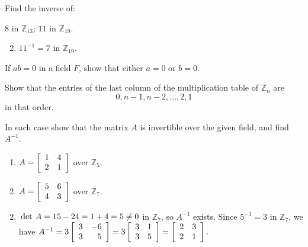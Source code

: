 \begin{multicols}{2}
\begin{ex}
Find the inverse of:

\begin{exenumerate}
\exitem $8$ in $\mathbb{Z}_{13}$;
\exitem $11$ in $\mathbb{Z}_{19}$.
\end{exenumerate}
\begin{sol}
\begin{enumerate}[label={\alph*.}]
\setcounter{enumi}{1}
\item  $11^{-1} = 7$ in $\mathbb{Z}_{19}$.

\end{enumerate}
\end{sol}
\end{ex}

\begin{ex}
If $ab = 0$ in a field $F$, show that either $a = 0$ or $b = 0$.
\end{ex}

\begin{ex}
Show that the entries of the last column of the multiplication table of $\mathbb{Z}_n$ are 
\begin{equation*}
0, n - 1, n - 2, \dots, 2, 1
\end{equation*}
 in that order.
\end{ex}

\begin{ex}
In each case show that the matrix $A$ is invertible over the given field, and find $A^{-1}$.

\begin{enumerate}[label={\alph*.}]
\item $A = \left[ \begin{array}{rr}
1 & 4 \\
2 & 1 
\end{array}\right]$ over $\mathbb{Z}_5$.

\item $A = \left[ \begin{array}{rr}
5 & 6 \\
4 & 3 
\end{array}\right]$ over $\mathbb{Z}_7$.

\end{enumerate}
\begin{sol}
\begin{enumerate}[label={\alph*.}]
\setcounter{enumi}{1}
\item  $\thinspace\operatorname{det\medspace} A = 15 - 24 = 1 + 4 = 5 \neq 0$ in $\mathbb{Z}_{7}$, so $A^{-1}$ exists. Since $5^{-1} = 3$ in $\mathbb{Z}_{7}$, we have
$A^{-1} = 3\left[ \begin{array}{rr}
3 & -6 \\
3 & 5 
\end{array}\right] = 3\left[ \begin{array}{rr}
3 & 1 \\
3 & 5 
\end{array}\right] = \left[ \begin{array}{rr}
2 & 3 \\
2 & 1 
\end{array}\right].$
\end{enumerate}
\end{sol}
\end{ex}


\end{multicols}
